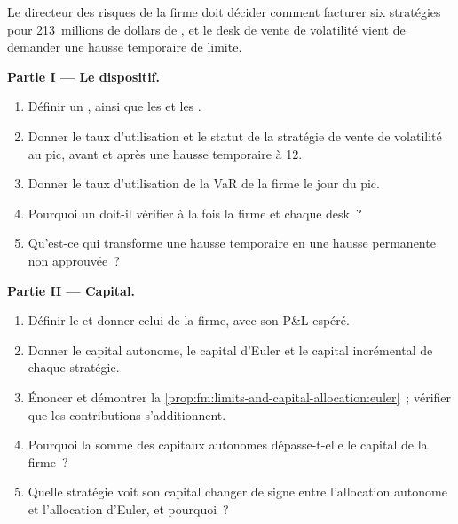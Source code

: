 \begin{problem}\label{pb:fm:limits-and-capital-allocation:1}
Le directeur des risques de la firme doit décider comment facturer six stratégies pour 213~millions de dollars de , et le desk de vente de volatilité vient de demander
une hausse temporaire de limite.

\medskip\noindent\textbf{Partie I --- Le dispositif.}
\begin{enumerate}
\item Définir un , ainsi que les  et les .
\item Donner le taux d'utilisation et le statut de la stratégie de vente de volatilité au pic, avant et après une hausse temporaire à 12.
\item Donner le taux d'utilisation de la VaR de la firme le jour du pic.
\item Pourquoi un  doit-il vérifier à la fois la firme et chaque desk~?
\item Qu'est-ce qui transforme une hausse temporaire en une hausse permanente non approuvée~?
\end{enumerate}

\medskip\noindent\textbf{Partie II --- Capital.}
\begin{enumerate}[resume]
\item Définir le  et donner celui de la firme, avec son P\&L espéré.
\item Donner le capital autonome, le capital d'Euler et le capital incrémental de chaque stratégie.
\item Énoncer et démontrer la \cref{prop:fm:limits-and-capital-allocation:euler}~; vérifier que les contributions s'additionnent.
\item Pourquoi la somme des capitaux autonomes dépasse-t-elle le capital de la firme~?
\item Quelle stratégie voit son capital changer de signe entre l'allocation autonome et l'allocation d'Euler, et pourquoi~?
\end{enumerate}


\end{problem}
